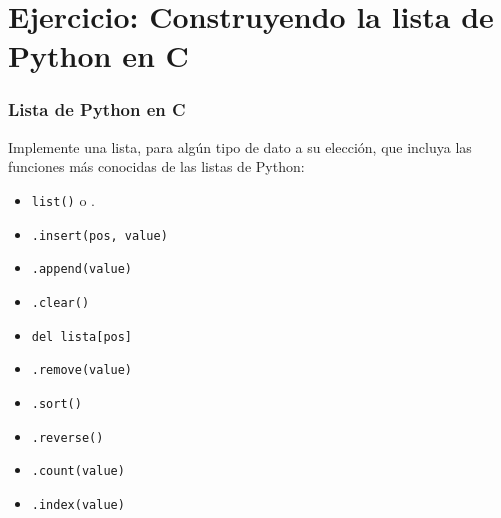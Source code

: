 \documentclass{beamer}
\begin{document}
\section{Ejercicio: Construyendo la lista de Python en C}
\begin{frame}[fragile]
\frametitle{Lista de Python en C}

Implemente una lista, para algún tipo de dato a su elección, que incluya las funciones más conocidas de las listas de Python:

\begin{itemize}
\item \texttt{list()} o \text{[]}.
\item \texttt{.insert(pos, value)}
\item \texttt{.append(value)}
\item \texttt{.clear()}
\item \texttt{del lista[pos]}
\item \texttt{.remove(value)}
\item \texttt{.sort()}
\item \texttt{.reverse()}
\item \texttt{.count(value)}
\item \texttt{.index(value)}
\end{itemize}

\end{frame}
\end{document}
